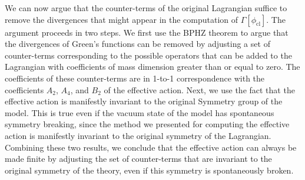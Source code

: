 We can now argue that the counter-terms of the original Lagrangian suffice to remove the divergences that might appear in the computation of $\Gamma[\phi_{\mathrm{cl}}]$. The argument proceeds in two steps. We first use the BPHZ theorem to argue that the divergences of Green's functions can be removed by adjusting a set of counter-terms corresponding to the possible operators that can be added to the Lagrangian with coefficients of mass dimension greater than or equal to zero. The coefficients of these counter-terms are in 1-to-1 correspondence with the coefficients $A_2$, $A_4$, and $B_2$ of the effective action. Next, we use the fact that the effective action is manifestly invariant to the original Symmetry group of the model. This is true even if the vacuum state of the model has spontaneous symmetry breaking, since the method we presented for computing the effective action is manifestly invariant to the original symmetry of the Lagrangian. Combining these two results, we conclude that the effective action can always be made finite by adjusting the set of counter-terms that are invariant to the original symmetry of the theory, even if this symmetry is spontaneously broken.

